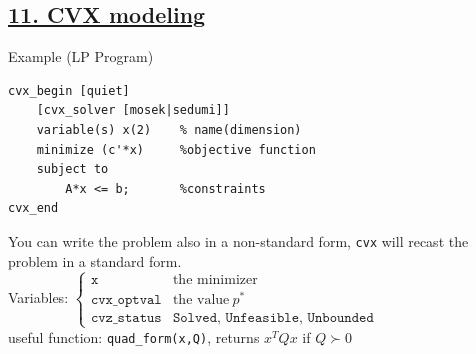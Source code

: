 \documentclass[a4paper]{article}
\begin{document}
\subsection*{\underline{11. CVX modeling}}
\begin{multicols}{2}
    \noindent
Example (LP Program)
\begin{verbatim}
cvx_begin [quiet]
    [cvx_solver [mosek|sedumi]]        
    variable(s) x(2)    % name(dimension)
    minimize (c'*x)     %objective function
    subject to             
        A*x <= b;       %constraints
cvx_end 
\end{verbatim}
    \newcolumn
    You can write the problem also in a non-standard form, \texttt{cvx} will recast the problem in a standard form. \\
    Variables: $\begin{cases}
        \texttt{x}&\text{the minimizer}\\
        \texttt{cvx\_optval}&\text{the value} \ p^*\\
        \texttt{cvz\_status}&\texttt{Solved, Unfeasible, Unbounded}
    \end{cases}$\\

    \noindent
    useful function: \texttt{quad\_form(x,Q)}, returns $x^T{Q}x$ if $Q\succ0$
\end{multicols}
\end{document}
